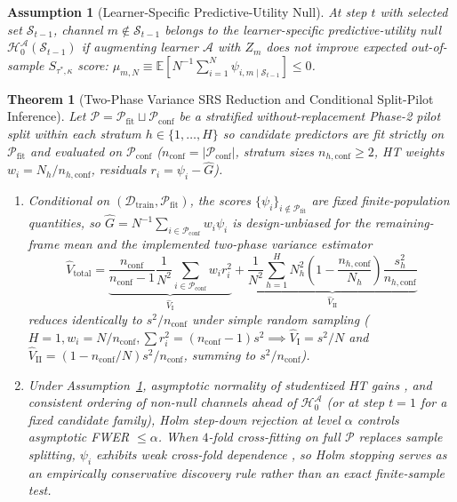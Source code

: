 \documentclass[11pt]{article}
\newtheorem{theorem}{Theorem}
\newtheorem{assumption}{Assumption}
\begin{document}
\begin{assumption}[Learner-Specific Predictive-Utility Null]
\label{assump:null_nonpos}
At step $t$ with selected set $\mathcal{S}_{t-1}$, channel $m \notin \mathcal{S}_{t-1}$ belongs to the learner-specific predictive-utility null $\mathcal{H}_0^{\mathcal{A}}(\mathcal{S}_{t-1})$ if augmenting learner $\mathcal{A}$ with $Z_m$ does not improve expected out-of-sample $S_{\tau^*,\kappa}$ score: $\mu_{m,N} \equiv \mathbb{E}[N^{-1}\sum_{i=1}^N \psi_{i,m\mid\mathcal{S}_{t-1}}] \le 0$.
\end{assumption}

\begin{theorem}[Two-Phase Variance SRS Reduction and Conditional Split-Pilot Inference]
\label{thm:hsfp_neyman}
Let $\mathcal{P} = \mathcal{P}_{\text{fit}} \sqcup \mathcal{P}_{\text{conf}}$ be a stratified without-replacement Phase-2 pilot split within each stratum $h \in \{1,\dots,H\}$ so candidate predictors are fit strictly on $\mathcal{P}_{\text{fit}}$ and evaluated on $\mathcal{P}_{\text{conf}}$ ($n_{\text{conf}} = |\mathcal{P}_{\text{conf}}|$, stratum sizes $n_{h,\text{conf}} \ge 2$, HT weights $w_i = N_h / n_{h,\text{conf}}$, residuals $r_i = \psi_i - \hat{G}$).
\begin{enumerate}
  \item Conditional on $(\mathcal{D}_{\text{train}}, \mathcal{P}_{\text{fit}})$, the scores $\{\psi_i\}_{i \notin \mathcal{P}_{\text{fit}}}$ are fixed finite-population quantities, so $\hat{G} = N^{-1}\sum_{i\in\mathcal{P}_{\text{conf}}} w_i \psi_i$ is design-unbiased for the remaining-frame mean and the implemented two-phase variance estimator
  \begin{equation}
    \widehat{V}_{\text{total}} = \underbrace{\frac{n_{\text{conf}}}{n_{\text{conf}}-1}\frac{1}{N^2}\sum_{i \in \mathcal{P}_{\text{conf}}} w_i r_i^2}_{\widehat{V}_{\text{I}}} + \underbrace{\frac{1}{N^2}\sum_{h=1}^H N_h^2 \left(1 - \frac{n_{h,\text{conf}}}{N_h}\right)\frac{s_h^2}{n_{h,\text{conf}}}}_{\widehat{V}_{\text{II}}}
    \label{eq:two_phase_var}
  \end{equation}
  reduces identically to $s^2 / n_{\text{conf}}$ under simple random sampling ($H=1, w_i = N/n_{\text{conf}}, \sum r_i^2 = (n_{\text{conf}}-1)s^2 \implies \widehat{V}_{\text{I}} = s^2/N$ and $\widehat{V}_{\text{II}} = (1 - n_{\text{conf}}/N)s^2/n_{\text{conf}}$, summing to $s^2/n_{\text{conf}}$).
  \item Under Assumption~\ref{assump:null_nonpos}, asymptotic normality of studentized HT gains \citep{williamson2021nonparametric}, and consistent ordering of non-null channels ahead of $\mathcal{H}_0^{\mathcal{A}}$ (or at step $t=1$ for a fixed candidate family), Holm step-down rejection at level $\alpha$ controls asymptotic FWER $\le \alpha$. When $4$-fold cross-fitting on full $\mathcal{P}$ replaces sample splitting, $\psi_i$ exhibits weak cross-fold dependence \citep{nadeau2003inference,bates2024crossvalidation}, so Holm stopping serves as an empirically conservative discovery rule rather than an exact finite-sample test.
\end{enumerate}
\end{theorem}
\end{document}
